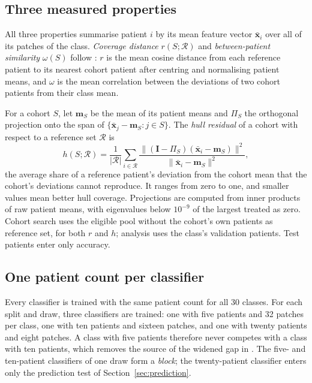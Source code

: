 \documentclass[11pt]{article}
\begin{document}
\subsection{Three measured properties}
\label{sec:quantities}
All three properties summarise patient $i$ by its mean feature vector $\bar{\mathbf x}_i$ over all of its patches of the class. \emph{Coverage distance} $r(S;\mathcal R)$ and \emph{between-patient similarity} $\omega(S)$ follow \citet{queisler2026shortageDecomposition}: $r$ is the mean cosine distance from each reference patient to its nearest cohort patient after centring and normalising patient means, and $\omega$ is the mean correlation between the deviations of two cohort patients from their class mean.

For a cohort $S$, let $\mathbf m_S$ be the mean of its patient means and $\Pi_S$ the orthogonal projection onto the span of $\{\bar{\mathbf x}_j-\mathbf m_S : j\in S\}$. The \emph{hull residual} of a cohort with respect to a reference set $\mathcal R$ is
\begin{equation}
 h(S;\mathcal R)=\frac{1}{|\mathcal R|}\sum_{i\in\mathcal R}\frac{\lVert(\mathbf I-\Pi_S)(\bar{\mathbf x}_i-\mathbf m_S)\rVert^2}{\lVert\bar{\mathbf x}_i-\mathbf m_S\rVert^2},
 \label{eq:hull}
\end{equation}
\noindent the average share of a reference patient's deviation from the cohort mean that the cohort's deviations cannot reproduce. It ranges from zero to one, and smaller values mean better hull coverage. Projections are computed from inner products of raw patient means, with eigenvalues below $10^{-9}$ of the largest treated as zero. Cohort search uses the eligible pool without the cohort's own patients as reference set, for both $r$ and $h$; analysis uses the class's validation patients. Test patients enter only accuracy.

\subsection{One patient count per classifier}
\label{sec:counts}
Every classifier is trained with the same patient count for all 30 classes. For each split and draw, three classifiers are trained: one with five patients and 32 patches per class, one with ten patients and sixteen patches, and one with twenty patients and eight patches. A class with five patients therefore never competes with a class with ten patients, which removes the source of the widened gap in \citet{queisler2026shortageDecomposition}. The five- and ten-patient classifiers of one draw form a \emph{block}; the twenty-patient classifier enters only the prediction test of Section~\ref{sec:prediction}.
\end{document}
